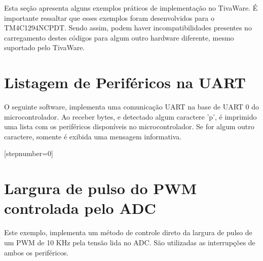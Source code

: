 Esta seção apresenta alguns exemplos práticos de implementação no TivaWare. É importante ressaltar que esses exemplos foram desenvolvidos para o TM4C1294NCPDT. Sendo assim, podem haver incompatibilidades presentes no carregamento destes códigos para algum outro hardware diferente, mesmo suportado pelo TivaWare.

\minitocsection

\section{Listagem de Periféricos na UART}
\label{sec:exUart}
O seguinte software, implementa uma comunicação UART na base de UART 0 do microcontrolador. Ao receber bytes, e detectado algum caractere 'p', é imprimido uma lista com os periféricos disponíveis no microcontrolador. Se for algum outro caractere, somente é exibida uma mensagem informativa.

[stepnumber=0]

\section{Largura de pulso do PWM controlada pelo ADC}
\label{sec:exPwm}

Este exemplo, implementa um método de controle direto da largura de pulso de um PWM de 10 KHz  pela tensão lida no ADC. São utilizadas as interrupções de ambos os periféricos.


